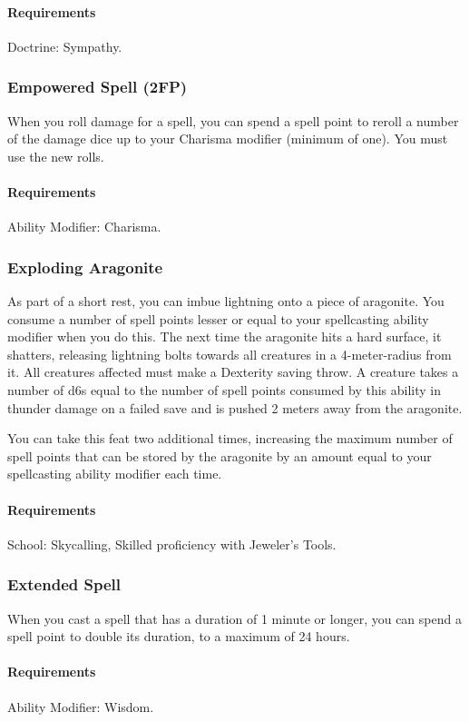     \paragraph{Requirements} Doctrine: Sympathy.
\subsubsection{Empowered Spell (2FP)} \label{feat::empoweredspell}
    When you roll damage for a spell, you can spend a spell point to reroll a number of the damage dice up to your Charisma modifier (minimum of one).
    You must use the new rolls.
    \paragraph{Requirements} Ability Modifier: Charisma.
\subsubsection{Exploding Aragonite} \label{feat::explodingaragonite}
    As part of a short rest, you can imbue lightning onto a piece of aragonite.
    You consume a number of spell points lesser or equal to your spellcasting ability modifier when you do this.
    The next time the aragonite hits a hard surface, it shatters, releasing lightning bolts towards all creatures in a 4-meter-radius from it.
    All creatures affected must make a Dexterity saving throw.
    A creature takes a number of d6s equal to the number of spell points consumed by this ability in thunder damage on a failed save and is pushed 2 meters away from the aragonite.

    You can take this feat two additional times, increasing the maximum number of spell points that can be stored by the aragonite by an amount equal to your spellcasting ability modifier each time.
    \paragraph{Requirements} School: Skycalling, Skilled proficiency with Jeweler's Tools.
\subsubsection{Extended Spell} \label{feat::extendedspell}
    When you cast a spell that has a duration of 1 minute or longer, you can spend a spell point to double its duration, to a maximum of 24 hours.
    \paragraph{Requirements} Ability Modifier: Wisdom.
